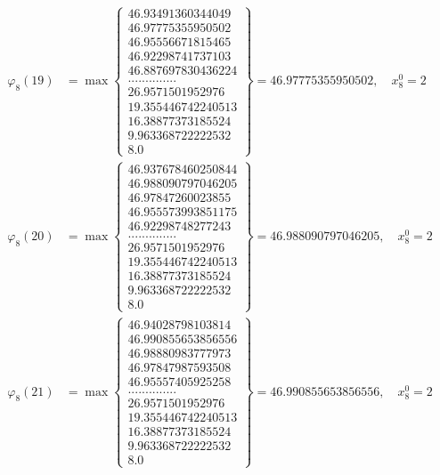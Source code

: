 \documentclass{article}
\begin{document}
\begin{align*}
  
  
  
\varphi_{8}(19) &= \max \left\{ \begin{array}{c}
46.93491360344049 \\
 46.97775355950502 \\
 46.95556671815465 \\
 46.92298741737103 \\
 46.887697830436224 \\
 .............. \\
 26.9571501952976 \\
 19.355446742240513 \\
 16.38877373185524 \\
 9.963368722222532 \\
 8.0
\end{array} \right\} = 46.97775355950502, \quad x_{8}^0 = 2\\
  
  
  
  
\varphi_{8}(20) &= \max \left\{ \begin{array}{c}
46.937678460250844 \\
 46.988090797046205 \\
 46.97847260023855 \\
 46.955573993851175 \\
 46.92298748277243 \\
 .............. \\
 26.9571501952976 \\
 19.355446742240513 \\
 16.38877373185524 \\
 9.963368722222532 \\
 8.0
\end{array} \right\} = 46.988090797046205, \quad x_{8}^0 = 2\\
  
  
  
  
\varphi_{8}(21) &= \max \left\{ \begin{array}{c}
46.94028798103814 \\
 46.990855653856556 \\
 46.98880983777973 \\
 46.97847987593508 \\
 46.95557405925258 \\
 .............. \\
 26.9571501952976 \\
 19.355446742240513 \\
 16.38877373185524 \\
 9.963368722222532 \\
 8.0
\end{array} \right\} = 46.990855653856556, \quad x_{8}^0 = 2\\
  

\end{align*}
\end{document}
